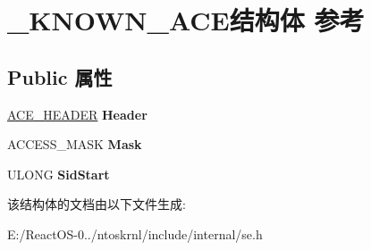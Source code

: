 \hypertarget{struct___k_n_o_w_n___a_c_e}{}\section{\+\_\+\+K\+N\+O\+W\+N\+\_\+\+A\+C\+E结构体 参考}
\label{struct___k_n_o_w_n___a_c_e}
\subsection*{Public 属性}
\begin{DoxyCompactItemize}
\item 
\mbox{\label{struct___k_n_o_w_n___a_c_e_a54cb4a9888227adece5d5fa2525b1a71}} 
\hyperlink{struct___a_c_e___h_e_a_d_e_r}{A\+C\+E\+\_\+\+H\+E\+A\+D\+ER} {\bfseries Header}
\item 
\mbox{\label{struct___k_n_o_w_n___a_c_e_a9450127a482353aab68a324d87e36b88}} 
A\+C\+C\+E\+S\+S\+\_\+\+M\+A\+SK {\bfseries Mask}
\item 
\mbox{\label{struct___k_n_o_w_n___a_c_e_a89c6db1084487164e0ce16d081024fb6}} 
U\+L\+O\+NG {\bfseries Sid\+Start}
\end{DoxyCompactItemize}


该结构体的文档由以下文件生成\+:\begin{DoxyCompactItemize}
\item 
E\+:/\+React\+O\+S-\/0../ntoskrnl/include/internal/se.\+h\end{DoxyCompactItemize}

